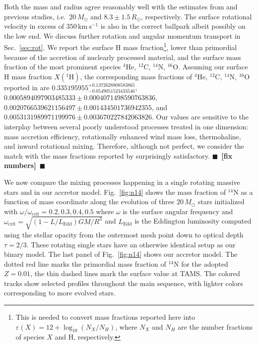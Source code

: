 \documentclass[twocolumn,twocolappendix,trackchanges]{aastex63}
\newcommand{\kms}{{\mathrm{km\ s^{-1}}}}
\DeclareRobustCommand{\Figref}[1]{Fig.~\ref{#1}}
\DeclareRobustCommand{\Secref}[1]{Sec.~\ref{#1}}
\newcommand{\todo}[1]{{\large $\blacksquare$~\textbf{\color{red}[#1]}}~$\blacksquare$}
\begin{document}
Both the mass and radius agree reasonably well with the estimates from
\cite{villamariz:05} and previous studies, i.e.~$20\,M_\odot$ and
$8.3\pm1.5\,R_\odot$, respectively. The surface rotational velocity in
excess of $350\,\kms$ is also in the correct ballpark albeit possibly
on the low end. We discuss further rotation and angular momentum
transport in \Secref{sec:rot}. We report the surface H mass
fraction\footnote{This is needed to convert mass fractions reported
  here into $\varepsilon(X)=12+\log_{10}(N_X/N_H)$, where $N_X$ and
  $N_H$ are the number fractions of species $X$ and H, respectively.},
lower than primordial because of the accretion of nuclearly processed
material, and the surface mass fraction of the most prominent species
$^4\mathrm{He}$, $^{12}\mathrm{C}$, $^{14}\mathrm{N}$,
$^{16}\mathrm{O}$.  Assuming our surface H mass fraction
$X(^1\mathrm{H})$, the corresponding mass fractions of $^4\mathrm{He}$,
$^{12}\mathrm{C}$, $^{14}\mathrm{N}$, $^{16}\mathrm{O}$ reported in
\cite{villamariz:05} are
$0.335195955^{+0.1372628808583865}_{-0.0549051523433546}$,
$0.0005894097903485333\pm0.0004071498590763836$,
$0.0020766539621156497\pm0.001434501736942355$, and
$0.0053131989971199976\pm0.003670227842063826$.  Our values are
sensitive to the interplay between several poorly understood
processes treated in one dimension: mass accretion efficiency, rotationally enhanced wind mass
loss, thermohaline, and inward rotational mixing. Therefore, although
not perfect, we consider the match with the mass fractions reported by
\cite{villamariz:05} surprisingly satisfactory. \todo{fix numbers}

We now compare the mixing processes
happening in a single rotating massive stars and in our accretor
model. \Figref{fig:n14} shows the mass fraction of $^{14}\mathrm{N}$
as a function of mass coordinate along the evolution of three
$20\,M_\odot$ stars initialized with
$\omega/\omega_\mathrm{crit}=0.2,0.3,0.4,0.5$ where $\omega$ is the
surface angular frequency and
$\omega_\mathrm{crit}=\sqrt{(1-L/L_\mathrm{Edd})GM/R^3}$ and
$L_\mathrm{Edd}$ is the Eddington luminosity computed using the
stellar opacity from the outermost mesh point down to optical depth
$\tau=2/3$. These rotating single stars have an otherwise identical
setup as our binary model. The last panel of \Figref{fig:n14} shows
our accretor model. The dotted red line marks the primordial mass
fraction of $^{14}\mathrm{N}$ for the adopted $Z=0.01$, the thin
dashed lines mark the surface value at TAMS. The colored tracks show
selected profiles throughout the main sequence, with lighter colors
corresponding to more evolved stars.
\end{document}
